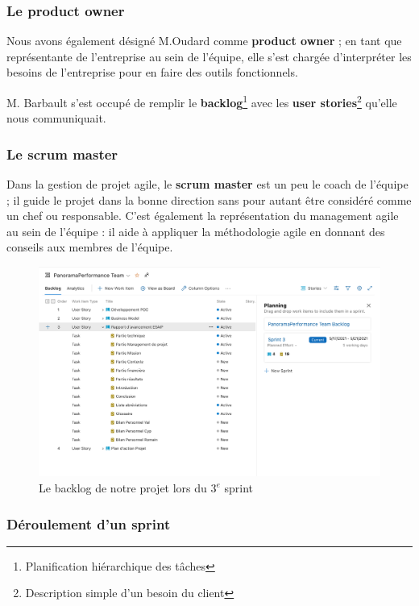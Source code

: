 \subsubsection*{Le product owner}
Nous avons également désigné M.Oudard comme \textbf{product owner}\cite{ProductOwner} ; en tant que représentante de l'entreprise au sein de l'équipe, elle s'est chargée d'interpréter les besoins de l'entreprise pour en faire des outils fonctionnels.

M. Barbault s'est occupé de remplir le \textbf{backlog}\footnote{Planification hiérarchique des tâches} avec les \textbf{user stories}\footnote{Description simple d'un besoin du client} qu'elle nous communiquait.

\subsubsection*{Le scrum master}


Dans la gestion de projet agile, le \textbf{scrum master}\cite{ScrumMaster} est un peu le coach de l'équipe ; il guide le projet dans la bonne direction sans pour autant être considéré comme un chef ou responsable. C'est également la représentation du management agile au sein de l'équipe : il aide à appliquer la méthodologie agile en donnant des conseils aux membres de l'équipe.

\begin{figure}[!h]
    \centering
    \includegraphics[scale=0.18]{img/backlog.png}
    \caption{Le backlog de notre projet lors du $3^{e}$ sprint}
    \label{fig:my_label}
\end{figure}

\subsubsection*{Déroulement d'un sprint}

